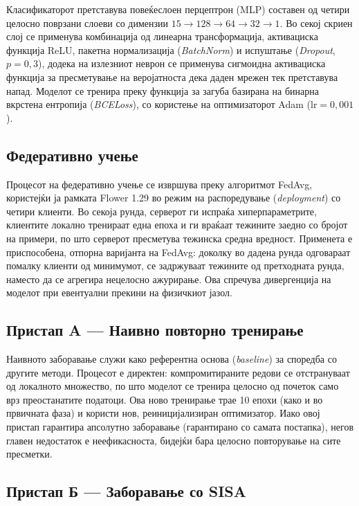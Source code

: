 Класификаторот претставува повеќеслоен перцептрон (MLP) составен од четири целосно поврзани слоеви со димензии $15\!\to\!128\!\to\!64\!\to\!32\!\to\!1$. Во секој скриен слој се применува комбинација од линеарна трансформација, активациска функција ReLU, пакетна нормализација (\emph{BatchNorm}) и испуштање (\emph{Dropout}, $p=0{,}3$), додека на излезниот неврон се применува сигмоидна активациска функција за пресметување на веројатноста дека даден мрежен тек претставува напад. Моделот се тренира преку функција за загуба базирана на бинарна вкрстена ентропија (\emph{BCELoss}), со користење на оптимизаторот Adam ($\text{lr}=0{,}001$).

\subsection{Федеративно учење}

Процесот на федеративно учење се извршува преку алгоритмот FedAvg, користејќи ја рамката Flower 1.29 во режим на распоредување (\emph{deployment}) со четири клиенти. Во секоја рунда, серверот ги испраќа хиперпараметрите, клиентите локално тренираат една епоха и ги враќаат тежините заедно со бројот на примери, по што серверот пресметува тежинска средна вредност. Применета е приспособена, отпорна варијанта на FedAvg: доколку во дадена рунда одговараат помалку клиенти од минимумот, се задржуваат тежините од претходната рунда, наместо да се агрегира нецелосно ажурирање. Ова спречува дивергенција на моделот при евентуални прекини на физичкиот јазол.

\subsection{Пристап A --- Наивно повторно тренирање}

Наивното заборавање служи како референтна основа (\emph{baseline}) за споредба со другите методи. Процесот е директен: компромитираните редови се отстрануваат од локалното множество, по што моделот се тренира целосно од почеток само врз преостанатите податоци. Ова ново тренирање трае 10 епохи (како и во првичната фаза) и користи нов, реиницијализиран оптимизатор. Иако овој пристап гарантира апсолутно заборавање (гарантирано со самата постапка), негов главен недостаток е неефикасноста, бидејќи бара целосно повторување на сите пресметки.

\subsection{Пристап Б --- Заборавање со SISA}

